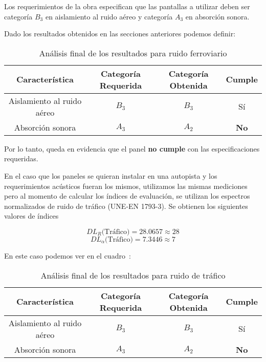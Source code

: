 \par Los requerimientos de la obra especifican que las pantallas a utilizar deben ser categoría $B_3$ en aislamiento al ruido aéreo y categoría $A_3$ en absorción sonora.

Dado los resultados obtenidos en las secciones anteriores podemos definir:

\begin{table}[]
    \centering
    \begin{tabular}{|c|c|c|c|} \hline
        Característica & Categoría Requerida & Categoría Obtenida & Cumple \\ \hline \hline
        Aislamiento al ruido aéreo & $B_3$ & $B_3$ & Sí \\ \hline
        Absorción sonora & $A_3$ & $A_2$ & \textbf{No} \\ \hline
    \end{tabular}
    \caption{Análisis final de los resultados para ruido ferroviario}
    \label{tab:analisis_final_ferroviario}
\end{table}

\par Por lo tanto, queda en evidencia que el panel \textbf{no cumple} con las especificaciones requeridas.\\

\par En el caso que los paneles se quieran instalar en una autopista y los requerimientos acústicos fueran los mismos, utilizamos las mismas mediciones pero al momento de calcular los índices de evaluación, se utilizan los espectros normalizados de ruido de tráfico (UNE-EN 1793-3). Se obtienen los siguientes valores de índices

\begin{equation}
    DL_R\text{(Tráfico)} =28.0657\approx 28
\end{equation}
\begin{equation}
    DL_\alpha \text{(Tráfico)} = 7.3446\approx 7  
\end{equation}

\par En este caso podemos ver en el cuadro~:

\begin{table}[]
    \centering
    \begin{tabular}{|c|c|c|c|} \hline
        Característica & Categoría Requerida & Categoría Obtenida & Cumple \\ \hline \hline
        Aislamiento al ruido aéreo & $B_3$ & $B_3$ & Sí \\ \hline
        Absorción sonora & $A_3$ & $A_2$ & \textbf{No} \\ \hline
    \end{tabular}
    \caption{Análisis final de los resultados para ruido de tráfico}
    \label{tab:analisis_final_trafico}
\end{table}

